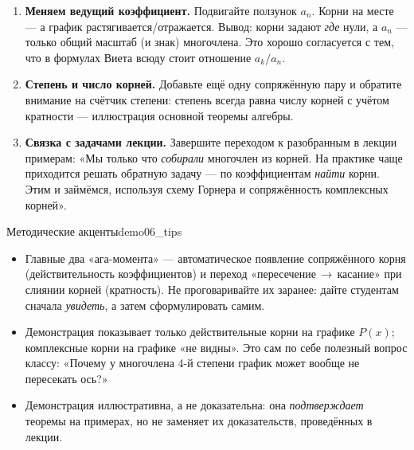 \begin{enumerate}
  \item \textbf{Меняем ведущий коэффициент.} Подвигайте ползунок
    $a_n$. Корни на месте — а график растягивается/отражается. Вывод:
    корни задают \emph{где} нули, а $a_n$ — только общий масштаб
    (и знак) многочлена. Это хорошо согласуется с тем, что в формулах
    Виета всюду стоит отношение $a_k/a_n$.

  \item \textbf{Степень и число корней.} Добавьте ещё одну
    сопряжённую пару и обратите внимание на счётчик степени: степень
    всегда равна числу корней с учётом кратности — иллюстрация
    основной теоремы алгебры.

  \item \textbf{Связка с задачами лекции.} Завершите переходом к
    разобранным в лекции примерам: «Мы только что \emph{собирали}
    многочлен из корней. На практике чаще приходится решать обратную
    задачу — по коэффициентам \emph{найти} корни. Этим и займёмся,
    используя схему Горнера и сопряжённость комплексных корней».
\end{enumerate}

\begin{remarkIT}{Методические акценты}{demo06_tips}
  \begin{itemize}
    \item Главные два «ага-момента» — автоматическое появление
      сопряжённого корня (действительность коэффициентов) и переход
      «пересечение\,$\to$\,касание» при слиянии корней (кратность).
      Не проговаривайте их заранее: дайте студентам сначала
      \emph{увидеть}, а затем сформулировать самим.
    \item Демонстрация показывает только действительные корни на
      графике $P(x)$; комплексные корни на графике «не видны». Это сам
      по себе полезный вопрос классу: «Почему у многочлена 4-й степени
      график может вообще не пересекать ось?»
    \item Демонстрация иллюстративна, а не доказательна: она
      \emph{подтверждает} теоремы на примерах, но не заменяет их
      доказательств, проведённых в лекции.
  \end{itemize}
\end{remarkIT}
